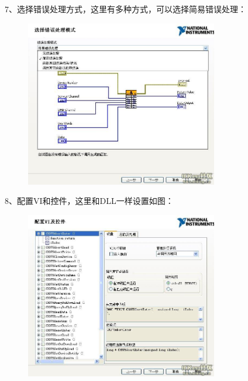 7、选择错误处理方式，这里有多种方式，可以选择简易错误处理：
\begin{figure}[h!]
\centering
\includegraphics[width=0.75\textwidth]{pictures/7.jpg}
\end{figure}

8、配置VI和控件，这里和DLL一样设置如图：
\begin{figure}[h!]
\centering
\includegraphics[width=0.75\textwidth]{pictures/8.jpg}
\end{figure}

